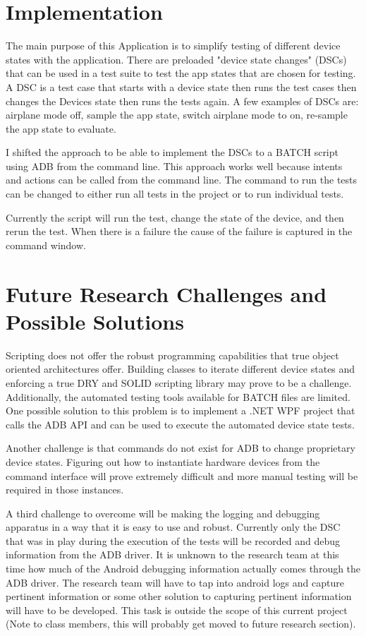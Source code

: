 \section{Implementation}
The main purpose of this Application is to simplify testing of different device states with the application.  There are preloaded "device state changes" (DSCs) that can be used in a test suite to test the app states that are chosen for testing.  A DSC is a test case that starts with a device state then runs the test cases then changes the Devices state then runs the tests again.  A few examples of DSCs are: airplane mode off, sample the app state, switch airplane mode to on, re-sample the app state to evaluate.

I shifted the approach to be able to implement the DSCs to a BATCH script using ADB from the command line.  This approach works well because intents and actions can be called from the command line.  The command to run the tests can be changed to either run all tests in the project or to run individual tests.  

Currently the script will run the test, change the state of the device, and then rerun the test.  When there is a failure the cause of the failure is captured in the command window.

\section{Future Research Challenges and Possible Solutions}
Scripting does not offer the robust programming capabilities that true object oriented architectures offer.  Building classes to iterate different device states and enforcing a true DRY and SOLID scripting library may prove to be a challenge.  Additionally, the automated testing tools available for BATCH files are limited.  One possible solution to this problem is to implement a .NET WPF project that calls the ADB API and can be used to execute the automated device state tests.  

Another challenge is that commands do not exist for ADB to change proprietary device states.  Figuring out how to instantiate hardware devices from the command interface will prove extremely difficult and more manual testing will be required in those instances.   

A third challenge to overcome will be making the logging and debugging apparatus in a way that it is easy to use and robust.  Currently only the DSC that was in play during the execution of the tests will be recorded and debug information from the ADB driver.  It is unknown to the research team at this time how much of the Android debugging information actually comes through the ADB driver.  The research team will have to tap into android logs and capture pertinent information or some other solution to capturing pertinent information will have to be developed.  This task is outside the scope of this current project (Note to class members, this will probably get moved to future research section).\\ \\

